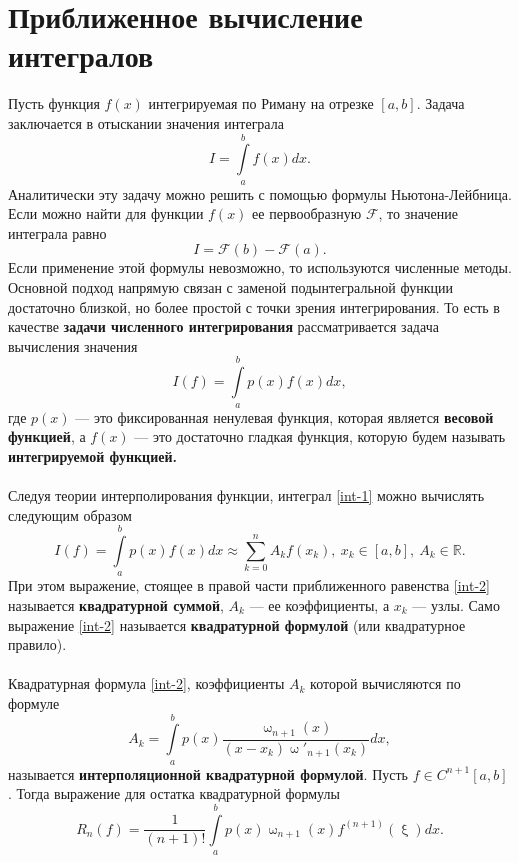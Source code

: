 \documentclass[a4paper, 12pt]{report}
\numberwithin{equation}{section}
\renewcommand{\omega}{\upomega}
\renewcommand{\xi}{\upxi}
\begin{document}
	\section{Приближенное вычисление интегралов}
	Пусть функция $f(x)$ интегрируемая по Риману на отрезке $[a,b]$. Задача заключается в отыскании значения интеграла $$I = \int\limits_a^b f(x)dx.$$
	Аналитически эту задачу можно решить с помощью формулы Ньютона-Лейбница. Если можно найти для функции $f(x)$ ее первообразную $\mathcal F$, то значение интеграла равно $$I = \mathcal F(b) - \mathcal F(a).$$ Если применение этой формулы невозможно, то используются численные методы.
	Основной подход напрямую связан с заменой подынтегральной функции достаточно близкой, но более простой с точки зрения интегрирования. То есть в качестве \textbf{задачи численного интегрирования} рассматривается задача вычисления значения 
		\begin{equation}
			\label{int-1}
			I(f) = \int\limits_a^b p(x)f(x)dx,
		\end{equation} где $p(x)$ --- это фиксированная ненулевая функция, которая является \textbf{весовой функцией}, а $f(x)$ --- это достаточно гладкая функция, которую будем называть \textbf{интегрируемой функцией.} \\\\
	Следуя теории интерполирования функции, интеграл \eqref{int-1} можно вычислять следующим образом 
	\begin{equation}
		\label{int-2}
		I (f) = \int\limits_a^b p(x) f(x)dx \approx \sum_{k=0}^{n}A_k f(x_k),\ x_k\in[a,b],\ A_k\in \mathbb R.
	\end{equation}
	При этом выражение, стоящее в правой части приближенного равенства \eqref{int-2} называется \textbf{квадратурной суммой}, $A_k$ --- ее коэффициенты, а $x_k$ --- узлы. Само выражение \eqref{int-2} называется \textbf{квадратурной формулой} (или квадратурное правило).\\\\
	Квадратурная формула \eqref{int-2}, коэффициенты $A_k$ которой вычисляются по формуле 
	\begin{equation}
		A_k = \int\limits_a^b p(x) \dfrac{\omega_{n+1}(x)}{(x-x_k)\omega'_{n+1}(x_k)}dx,
	\end{equation}
	называется \textbf{интерполяционной квадратурной формулой}.
	Пусть $f\in C^{n+1}[a,b]$. Тогда выражение для остатка квадратурной формулы
	\begin{equation}
		R_n(f) = \dfrac{1}{(n+1)!} \int\limits_a^b p(x)\omega_{n+1}(x)f^{(n+1)}(\xi)dx.
	\end{equation}
\end{document}
